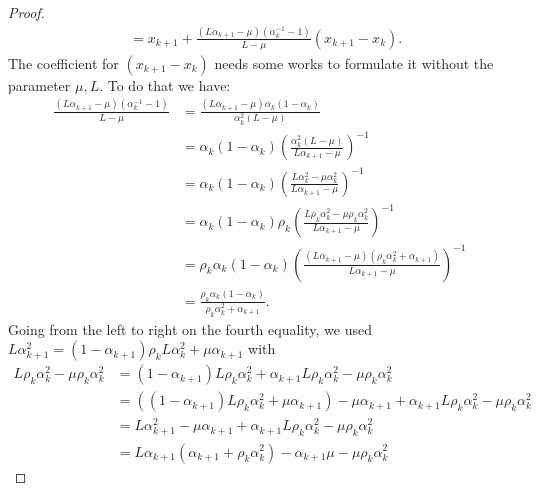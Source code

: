 \documentclass[12pt]{article}
\begin{document}
\begin{proof}
{\begin{align*}
            &= x_{k + 1} + \frac{(L\alpha_{k + 1} - \mu)(\alpha_k^{-1} - 1)}{L - \mu}(x_{k + 1} - x_k). 
        \end{align*}
        }
        The coefficient for $(x_{k + 1} - x_k)$ needs some works to formulate it without the parameter $\mu, L$. 
        To do that we have: 
        \begin{align*}
            \frac{(L\alpha_{k + 1} - \mu)(\alpha_k^{-1} - 1)}{L - \mu}
            &= \frac{(L\alpha_{k + 1} - \mu)\alpha_k(1 - \alpha_k)}{\alpha_k^2(L - \mu)}
            \\
            &= 
            \alpha_k(1 - \alpha_k)
            \left(
                \frac{\alpha_k^2(L - \mu)}{L\alpha_{k + 1} - \mu}
            \right)^{-1}
            \\
            &= \alpha_k(1 - \alpha_k)
            \left(
                \frac{L\alpha_k^2 - \mu\alpha_k^2}{L\alpha_{k + 1} - \mu}
            \right)^{-1}
            \\
            &= 
            \alpha_k(1 - \alpha_k)
            \rho_k\left(
                \frac{L\rho_k\alpha_k^2 - \mu\rho_k\alpha_k^2}{L\alpha_{k + 1} - \mu}
            \right)^{-1}
            \\
            &= 
            \rho_k\alpha_k(1 - \alpha_k)
            \left(
                \frac{(L\alpha_{k + 1} - \mu)(\rho_k\alpha_k^2 + \alpha_{k + 1})}
                {L\alpha_{k + 1} - \mu}
            \right)^{-1}
            \\
            &= \frac{\rho_k\alpha_k(1 - \alpha_k)}{\rho_k\alpha_k^2 + \alpha_{k + 1}}.
        \end{align*}
        Going from the left to right on the fourth equality, we used $L\alpha_{k + 1}^2 = (1 - \alpha_{k + 1})\rho_kL\alpha_k^2 + \mu \alpha_{k + 1}$ with 
        \begin{align*}
            L \rho_k \alpha_k^2 - \mu \rho_k \alpha_k^2 
            &= 
            (1 - \alpha_{k + 1})L \rho_k \alpha_k^2 + \alpha_{k + 1} L \rho_k \alpha_k^2 - \mu \rho_k \alpha_k^2
            \\
            &= 
            ((1 - \alpha_{k + 1})L \rho_k \alpha_k^2 + \mu \alpha_{k + 1}) - \mu\alpha_{k + 1} + \alpha_{k + 1} L \rho_k \alpha_k^2 - \mu \rho_k \alpha_k^2
            \\
            &= L \alpha_{k + 1}^2 - \mu\alpha_{k + 1} + \alpha_{k + 1}L\rho_k\alpha_k^2 - \mu \rho_k \alpha_k^2
            \\
            &= 
            L\alpha_{k + 1}(\alpha_{k + 1} + \rho_k \alpha_k^2) - \alpha_{k + 1}\mu - \mu \rho_k \alpha_k^2

\end{align*}
\end{proof}
\end{document}
